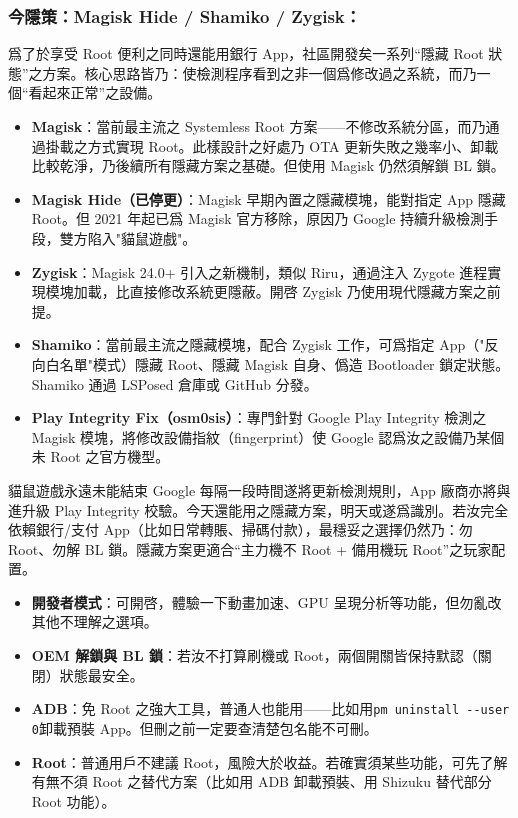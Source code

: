 \subsubsection*{今隱策：Magisk Hide / Shamiko / Zygisk：}

爲了於享受 Root 便利之同時還能用銀行 App，社區開發矣一系列“隱藏 Root 狀態”之方案。核心思路皆乃：使檢測程序看到之非一個爲修改過之系統，而乃一個“看起來正常”之設備。

\begin{itemize}
  \item \textbf{Magisk}：當前最主流之 Systemless Root 方案——不修改系統分區，而乃通過掛載之方式實現 Root。此樣設計之好處乃 OTA 更新失敗之幾率小、卸載比較乾淨，乃後續所有隱藏方案之基礎。但使用 Magisk 仍然須解鎖 BL 鎖。
  \item \textbf{Magisk Hide（已停更）}：Magisk 早期內置之隱藏模塊，能對指定 App 隱藏 Root。但 2021 年起已爲 Magisk 官方移除，原因乃 Google 持續升級檢測手段，雙方陷入"貓鼠遊戲"。
  \item \textbf{Zygisk}：Magisk 24.0+ 引入之新機制，類似 Riru，通過注入 Zygote 進程實現模塊加載，比直接修改系統更隱蔽。開啓 Zygisk 乃使用現代隱藏方案之前提。
  \item \textbf{Shamiko}：當前最主流之隱藏模塊，配合 Zygisk 工作，可爲指定 App（"反向白名單"模式）隱藏 Root、隱藏 Magisk 自身、僞造 Bootloader 鎖定狀態。Shamiko 通過 LSPosed 倉庫或 GitHub 分發。
  \item \textbf{Play Integrity Fix（osm0sis）}：專門針對 Google Play Integrity 檢測之 Magisk 模塊，將修改設備指紋（fingerprint）使 Google 認爲汝之設備乃某個未 Root 之官方機型。
\end{itemize}

\begin{tcbwarn}{貓鼠遊戲永遠未能結束}
Google 每隔一段時間遂將更新檢測規則，App 廠商亦將與進升級 Play Integrity 校驗。今天還能用之隱藏方案，明天或遂爲識別。若汝完全依賴銀行/支付 App（比如日常轉賬、掃碼付款），最穩妥之選擇仍然乃：勿 Root、勿解 BL 鎖。隱藏方案更適合“主力機不 Root + 備用機玩 Root”之玩家配置。

\end{tcbwarn}


\begin{itemize}
  \item \textbf{開發者模式}：可開啓，體驗一下動畫加速、GPU 呈現分析等功能，但勿亂改其他不理解之選項。
  \item \textbf{OEM 解鎖與 BL 鎖}：若汝不打算刷機或 Root，兩個開關皆保持默認（關閉）狀態最安全。
  \item \textbf{ADB}：免 Root 之強大工具，普通人也能用——比如用\texttt{pm uninstall -\allowbreak -\allowbreak user 0}卸載預裝 App。但刪之前一定要查清楚包名能不可刪。
  \item \textbf{Root}：普通用戶不建議 Root，風險大於收益。若確實須某些功能，可先了解有無不須 Root 之替代方案（比如用 ADB 卸載預裝、用 Shizuku 替代部分 Root 功能）。
\end{itemize}

